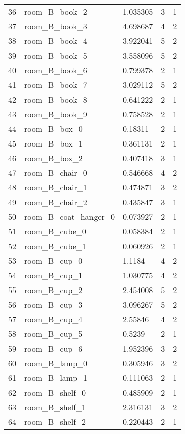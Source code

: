 \begin{longtable}{@{\zz\extracolsep{\fill}} l|llll}
36 & room\_B\_book\_2         & 1.035305 & 3 & 1 \\
37 & room\_B\_book\_3         & 4.698687 & 4 & 2 \\
38 & room\_B\_book\_4         & 3.922041 & 5 & 2 \\
39 & room\_B\_book\_5         & 3.558096 & 5 & 2 \\
40 & room\_B\_book\_6         & 0.799378 & 2 & 1 \\
41 & room\_B\_book\_7         & 3.029112 & 5 & 2 \\
42 & room\_B\_book\_8         & 0.641222 & 2 & 1 \\
43 & room\_B\_book\_9         & 0.758528 & 2 & 1 \\
44 & room\_B\_box\_0          & 0.18311  & 2 & 1 \\
45 & room\_B\_box\_1          & 0.361131 & 2 & 1 \\
46 & room\_B\_box\_2          & 0.407418 & 3 & 1 \\
47 & room\_B\_chair\_0        & 0.546668 & 4 & 2 \\
48 & room\_B\_chair\_1        & 0.474871 & 3 & 2 \\
49 & room\_B\_chair\_2        & 0.435847 & 3 & 1 \\
50 & room\_B\_coat\_hanger\_0 & 0.073927 & 2 & 1 \\
51 & room\_B\_cube\_0         & 0.058384 & 2 & 1 \\
52 & room\_B\_cube\_1         & 0.060926 & 2 & 1 \\
53 & room\_B\_cup\_0          & 1.1184   & 4 & 2 \\
54 & room\_B\_cup\_1          & 1.030775 & 4 & 2 \\
55 & room\_B\_cup\_2          & 2.454008 & 5 & 2 \\
56 & room\_B\_cup\_3          & 3.096267 & 5 & 2 \\
57 & room\_B\_cup\_4          & 2.55846  & 4 & 2 \\
58 & room\_B\_cup\_5          & 0.5239   & 2 & 1 \\
59 & room\_B\_cup\_6          & 1.952396 & 3 & 2 \\
60 & room\_B\_lamp\_0         & 0.305946 & 3 & 2 \\
61 & room\_B\_lamp\_1         & 0.111063 & 2 & 1 \\
62 & room\_B\_shelf\_0        & 0.485909 & 2 & 1 \\
63 & room\_B\_shelf\_1        & 2.316131 & 3 & 2 \\
64 & room\_B\_shelf\_2        & 0.220443 & 2 & 1 \\

\end{longtable}
